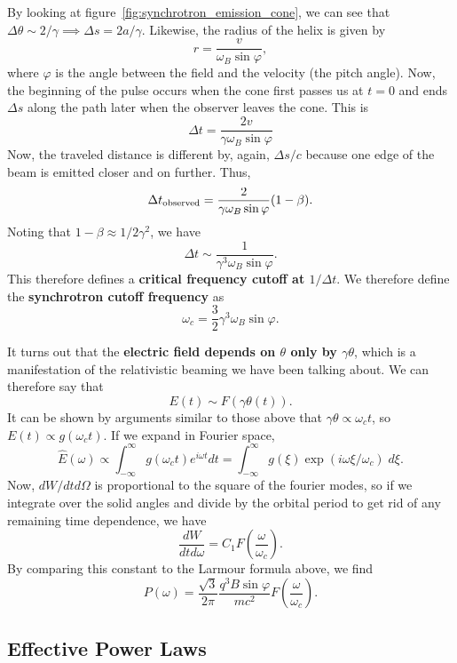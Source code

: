 By looking at figure~\ref{fig:synchrotron_emission_cone}, we can see that $\Delta \theta \sim 2/\gamma \implies \Delta s = 2a/\gamma$. Likewise, the radius of the helix is given by
\[
r = \frac{v}{\omega_B \sin \varphi},
\]
where $\varphi$ is the angle between the field and the velocity (the pitch angle). Now, the beginning of the pulse occurs when the cone first passes us at $t=0$ and ends $\Delta s$ along the path later when the observer leaves the cone. This is
\[
\Delta t = \frac{2v}{\gamma \omega_B \sin \varphi}
\]
Now, the traveled distance is different by, again, $\Delta s/c$ because one edge of the beam is emitted closer and on further. Thus,
\[
\Delta t_{\rm observed} = \frac{2}{\gamma \omega_B \sin \varphi}(1-\beta).
\]
Noting that $1-\beta \approx 1/2\gamma^2$, we have
\[
\Delta t \sim \frac{1}{\gamma^3 \omega_B \sin \varphi}.
\]
This therefore defines a \textbf{critical frequency cutoff at $1/\Delta t$}. We therefore define the \textbf{synchrotron cutoff frequency} as 
\[
\omega_c = \frac{3}{2} \gamma^3 \omega_B \sin \varphi.
\]
\par
It turns out that the \textbf{electric field depends on $\theta$ only by $\gamma \theta$}, which is a manifestation of the relativistic beaming we have been talking about.  We can therefore say that
\[
E(t) \sim F(\gamma \theta(t)).
\]
It can be shown by arguments similar to those above that $\gamma \theta \propto \omega_c t$, so $E(t) \propto g(\omega_c t)$.  If we expand in Fourier space,
\[
\hat{E}(\omega) \propto \int_{-\infty}^\infty g(\omega_ct) e^{i\omega t} dt = \int_{-\infty}^{\infty} g(\xi) \exp(i\omega\xi/\omega_c)\;d\xi.
\]
Now, $dW/dt d\Omega$ is proportional to the square of the fourier modes, so if we integrate over the solid angles and divide by the orbital period to get rid of any remaining time dependence, we have
\[
\frac{dW}{dt d\omega} = C_1F\left(\frac{\omega}{\omega_c}\right).
\]
By comparing this constant to the Larmour formula above, we find
\[
\boxed{
P(\omega) = \frac{\sqrt{3}}{2\pi} \frac{q^3B\sin\varphi}{mc^2} F\left(\frac{\omega}{\omega_c}\right).
}
\]
\subsection{Effective Power Laws}

